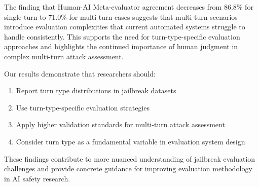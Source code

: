 \documentclass[11pt]{article}
\begin{document}
The finding that Human-AI Meta-evaluator agreement decreases from 86.8\% for single-turn to 71.0\% for multi-turn cases suggests that multi-turn scenarios introduce evaluation complexities that current automated systems struggle to handle consistently. This supports the need for turn-type-specific evaluation approaches and highlights the continued importance of human judgment in complex multi-turn attack assessment.

Our results demonstrate that researchers should:
\begin{enumerate}
    \item Report turn type distributions in jailbreak datasets
    \item Use turn-type-specific evaluation strategies
    \item Apply higher validation standards for multi-turn attack assessment
    \item Consider turn type as a fundamental variable in evaluation system design
\end{enumerate}

These findings contribute to more nuanced understanding of jailbreak evaluation challenges and provide concrete guidance for improving evaluation methodology in AI safety research.
\end{document}
